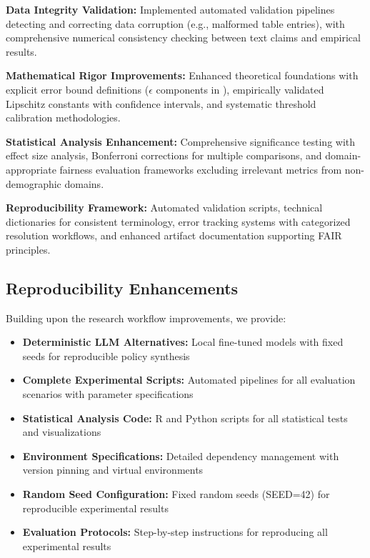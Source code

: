 \documentclass[sigconf,natbib]{acmart}
\begin{document}
\textbf{Data Integrity Validation:} Implemented automated validation pipelines detecting and correcting data corruption (e.g., malformed table entries), with comprehensive numerical consistency checking between text claims and empirical results.

\textbf{Mathematical Rigor Improvements:} Enhanced theoretical foundations with explicit error bound definitions ($\epsilon$ components in ), empirically validated Lipschitz constants with confidence intervals, and systematic threshold calibration methodologies.

\textbf{Statistical Analysis Enhancement:} Comprehensive significance testing with effect size analysis, Bonferroni corrections for multiple comparisons, and domain-appropriate fairness evaluation frameworks excluding irrelevant metrics from non-demographic domains.

\textbf{Reproducibility Framework:} Automated validation scripts, technical dictionaries for consistent terminology, error tracking systems with categorized resolution workflows, and enhanced artifact documentation supporting FAIR principles.

\subsection{Reproducibility Enhancements}
Building upon the research workflow improvements, we provide:

\begin{itemize}
    \item \textbf{Deterministic LLM Alternatives:} Local fine-tuned models with fixed seeds for reproducible policy synthesis
    \item \textbf{Complete Experimental Scripts:} Automated pipelines for all evaluation scenarios with parameter specifications
    \item \textbf{Statistical Analysis Code:} R and Python scripts for all statistical tests and visualizations
    \item \textbf{Environment Specifications:} Detailed dependency management with version pinning and virtual environments
    \item \textbf{Random Seed Configuration:} Fixed random seeds (SEED=42) for reproducible experimental results
    \item \textbf{Evaluation Protocols:} Step-by-step instructions for reproducing all experimental results
\end{itemize}
\end{document}
